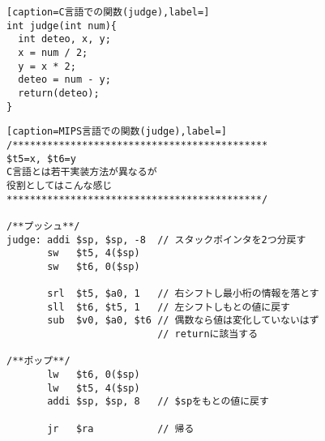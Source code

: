 \documentclass[a4paper, xelatex, ja=standard]{bxjsarticle}
\begin{document}
\begin{figure}[h]
\centering
\begin{minipage}[t]{0.3\linewidth}
\begin{lstlisting}[caption=C言語での関数(judge),label=]
int judge(int num){
  int deteo, x, y;
  x = num / 2;
  y = x * 2;
  deteo = num - y;
  return(deteo);
}
\end{lstlisting}
\end{minipage}
\hspace{15pt}
\begin{minipage}[t]{0.5\linewidth}
\begin{lstlisting}[caption=MIPS言語での関数(judge),label=]
/********************************************
$t5=x, $t6=y
C言語とは若干実装方法が異なるが
役割としてはこんな感じ
********************************************/

/**プッシュ**/
judge: addi $sp, $sp, -8  // スタックポインタを2つ分戻す
       sw   $t5, 4($sp)
       sw   $t6, 0($sp)

       srl  $t5, $a0, 1   // 右シフトし最小桁の情報を落とす
       sll  $t6, $t5, 1   // 左シフトしもとの値に戻す
       sub  $v0, $a0, $t6 // 偶数なら値は変化していないはず
                          // returnに該当する

/**ポップ**/
       lw   $t6, 0($sp)
       lw   $t5, 4($sp)
       addi $sp, $sp, 8   // $spをもとの値に戻す

       jr   $ra           // 帰る
\end{lstlisting}
\end{minipage}
\label{}
\end{figure}
\end{document}

